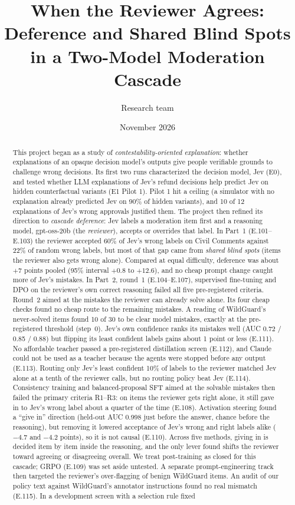 \documentclass[11pt]{article}
\title{When the Reviewer Agrees: Deference and Shared Blind Spots in a Two-Model Moderation Cascade}
\author{Research team}
\date{November 2026}
\renewcommand{\_}{\origunderscore\allowbreak}
\begin{document}
\maketitle

\begin{abstract}
This project began as a study of \emph{contestability-oriented explanation}: whether explanations of an opaque decision model's outputs give people verifiable grounds to challenge wrong decisions. Its first two runs characterized the decision model, Jev (E0), and tested whether LLM explanations of Jev's refund decisions help predict Jev on hidden counterfactual variants (E1 Pilot 1). Pilot 1 hit a ceiling (a simulator with no explanation already predicted Jev on 90\% of hidden variants), and 10 of 12 explanations of Jev's wrong approvals justified them. The project then refined its direction to \emph{cascade deference}: Jev labels a moderation item first and a reasoning model, gpt-oss-20b (the \emph{reviewer}), accepts or overrides that label. In Part~1 (E.101--E.103) the reviewer accepted 60\% of Jev's wrong labels on Civil Comments against 22\% of random wrong labels, but most of that gap came from \emph{shared blind spots} (items the reviewer also gets wrong alone). Compared at equal difficulty, deference was about $+7$ points pooled (95\% interval $+0.8$ to $+12.6$), and no cheap prompt change caught more of Jev's mistakes. In Part~2, round~1 (E.104--E.107), supervised fine-tuning and DPO on the reviewer's own correct reasoning failed all five pre-registered criteria. Round~2 aimed at the mistakes the reviewer can already solve alone. Its four cheap checks found no cheap route to the remaining mistakes. A reading of WildGuard's never-solved items found 10 of 30 to be clear model mistakes, exactly at the pre-registered threshold (step~0). Jev's own confidence ranks its mistakes well (AUC 0.72 / 0.85 / 0.88) but flipping its least confident labels gains about 1 point or less (E.111). No affordable teacher passed a pre-registered distillation screen (E.112), and Claude could not be used as a teacher because the agents were stopped before any output (E.113). Routing only Jev's least confident 10\% of labels to the reviewer matched Jev alone at a tenth of the reviewer calls, but no routing policy beat Jev (E.114). Consistency training and balanced-proposal SFT aimed at the solvable mistakes then failed the primary criteria R1--R3: on items the reviewer gets right alone, it still gave in to Jev's wrong label about a quarter of the time (E.108). Activation steering found a ``give in'' direction (held-out AUC 0.998 just before the answer, chance before the reasoning), but removing it lowered acceptance of Jev's wrong and right labels alike ($-4.7$ and $-4.2$ points), so it is not causal (E.110). Across five methods, giving in is decided item by item inside the reasoning, and the only lever found shifts the reviewer toward agreeing or disagreeing overall. We treat post-training as closed for this cascade; GRPO (E.109) was set aside untested. A separate prompt-engineering track then targeted the reviewer's over-flagging of benign WildGuard items. An audit of our policy text against WildGuard's annotator instructions found no real mismatch (E.115). In a development screen with a selection rule fixed 
\end{abstract}
\end{document}
